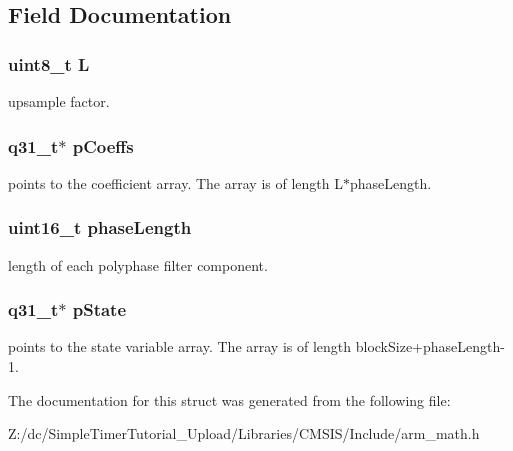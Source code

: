 \subsection{Field Documentation}
\hypertarget{structarm__fir__interpolate__instance__q31_aee73cc056696e504430c53eaa9c58cf0}{
\subsubsection[{L}]{\setlength{\rightskip}{0pt plus 5cm}uint8\-\_\-t L}}\label{structarm__fir__interpolate__instance__q31_aee73cc056696e504430c53eaa9c58cf0}
upsample factor. \hypertarget{structarm__fir__interpolate__instance__q31_a68888e36167d81cb7836db10367a1682}{
\subsubsection[{p\-Coeffs}]{\setlength{\rightskip}{0pt plus 5cm}q31\-\_\-t$\ast$ p\-Coeffs}}\label{structarm__fir__interpolate__instance__q31_a68888e36167d81cb7836db10367a1682}
points to the coefficient array. The array is of length L$\ast$phase\-Length. \hypertarget{structarm__fir__interpolate__instance__q31_a8f92bb07e0812f94679438cdf412b26a}{
\subsubsection[{phase\-Length}]{\setlength{\rightskip}{0pt plus 5cm}uint16\-\_\-t phase\-Length}}\label{structarm__fir__interpolate__instance__q31_a8f92bb07e0812f94679438cdf412b26a}
length of each polyphase filter component. \hypertarget{structarm__fir__interpolate__instance__q31_adee4ba3ee8869865af7d8fa08ca913d6}{
\subsubsection[{p\-State}]{\setlength{\rightskip}{0pt plus 5cm}q31\-\_\-t$\ast$ p\-State}}\label{structarm__fir__interpolate__instance__q31_adee4ba3ee8869865af7d8fa08ca913d6}
points to the state variable array. The array is of length block\-Size+phase\-Length-\/1. 

The documentation for this struct was generated from the following file\-:\begin{DoxyCompactItemize}
\item 
Z\-:/dc/\-Simple\-Timer\-Tutorial\-\_\-\-Upload/\-Libraries/\-C\-M\-S\-I\-S/\-Include/arm\-\_\-math.\-h\end{DoxyCompactItemize}
